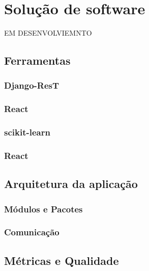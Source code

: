 \chapter*[Solução de software]{Solução de software}
EM DESENVOLVIEMNTO
\section{Ferramentas}
\subsection{Django-ResT}
\subsection{React}
\subsection{scikit-learn}
\subsection{React}

\section{Arquitetura da aplicação}
\subsection{Módulos e Pacotes}
\subsection{Comunicação}

\section{Métricas e Qualidade}